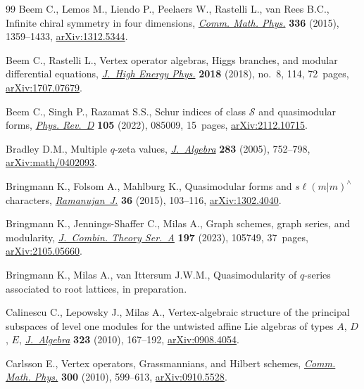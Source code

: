 \documentclass[pdftex]{sigma}
\numberwithin{equation}{section}
\theoremstyle{definition}
\begin{document}
\begin{thebibliography}{99}
Beem C., Lemos M., Liendo P., Peelaers W., Rastelli L., van Rees B.C., Infinite
 chiral symmetry in four dimensions,
 \href{https://doi.org/10.1007/s00220-014-2272-x}{\textit{Comm. Math. Phys.}}
 \textbf{336} (2015), 1359--1433,
 \href{https://arxiv.org/abs/1312.5344}{arXiv:1312.5344}.

Beem C., Rastelli L., Vertex operator algebras, {H}iggs branches, and modular
 differential equations,
 \href{https://doi.org/10.1007/jhep08(2018)114}{\textit{J.~High Energy Phys.}}
 \textbf{2018} (2018), no.~8, 114, 72~pages,
 \href{https://arxiv.org/abs/1707.07679}{arXiv:1707.07679}.

Beem C., Singh P., Razamat S.S., Schur indices of class {$\mathcal{S}$} and
 quasimodular forms,
 \href{https://doi.org/10.1103/physrevd.105.085009}{\textit{Phys. Rev.~D}}
 \textbf{105} (2022), 085009, 15~pages,
 \href{https://arxiv.org/abs/2112.10715}{arXiv:2112.10715}.

Bradley D.M., Multiple {$q$}-zeta values,
 \href{https://doi.org/10.1016/j.jalgebra.2004.09.017}{\textit{J.~Algebra}}
 \textbf{283} (2005), 752--798,
 \href{https://arxiv.org/abs/math/0402093}{arXiv:math/0402093}.

Bringmann K., Folsom A., Mahlburg K., Quasimodular forms and
 {$s\ell(m|m)^\wedge$} characters,
 \href{https://doi.org/10.1007/s11139-014-9621-4}{\textit{Ramanujan~J.}}
 \textbf{36} (2015), 103--116,
 \href{https://arxiv.org/abs/1302.4040}{arXiv:1302.4040}.

Bringmann K., Jennings-Shaffer C., Milas A., Graph schemes, graph series, and
 modularity,
 \href{https://doi.org/10.1016/j.jcta.2023.105749}{\textit{J.~Combin. Theory
 Ser.~A}} \textbf{197} (2023), 105749, 37~pages,
 \href{https://arxiv.org/abs/2105.05660}{arXiv:2105.05660}.

Bringmann K., Milas A., van Ittersum J.W.M., Quasimodularity  of $q$-series associated to root lattices, {i}n preparation.

Calinescu C., Lepowsky J., Milas A., Vertex-algebraic structure of the
 principal subspaces of level one modules for the untwisted affine {L}ie
 algebras of types {$A$, $D$, $E$},
 \href{https://doi.org/10.1016/j.jalgebra.2009.09.029}{\textit{J.~Algebra}}
 \textbf{323} (2010), 167--192,
 \href{https://arxiv.org/abs/0908.4054}{arXiv:0908.4054}.

Carlsson E., Vertex operators, {G}rassmannians, and {H}ilbert schemes,
 \href{https://doi.org/10.1007/s00220-010-1123-7}{\textit{Comm. Math. Phys.}}
 \textbf{300} (2010), 599--613,
 \href{https://arxiv.org/abs/0910.5528}{arXiv:0910.5528}.


\end{thebibliography}
\end{document}
